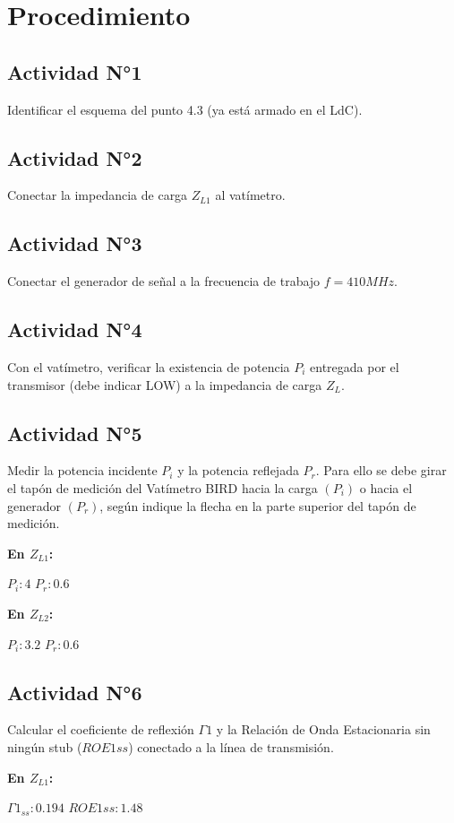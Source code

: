 \documentclass[12pt]{article}
\begin{document}
\section{Procedimiento}

\subsection{Actividad N°1}
Identificar el esquema del punto 4.3 (ya está armado en el LdC).

\subsection{Actividad N°2}
Conectar la impedancia de carga $Z_{L1}$ al vatímetro.

\subsection{Actividad N°3}
Conectar el generador de señal a la frecuencia de trabajo $f = 410 MHz$.
\subsection{Actividad N°4}
Con el vatímetro, verificar la existencia de potencia $P_i$ entregada por el transmisor (debe indicar LOW) a la impedancia de carga
$Z_L$.

\subsection{Actividad N°5}
Medir la potencia incidente $P_i$  y la potencia reflejada $P_r$. Para ello se debe girar el tapón de medición del Vatímetro BIRD hacia la
carga $(P_i)$ o hacia el generador $(P_r)$, según indique la flecha en la parte superior del tapón de medición.

\textbf{En $Z_{L1}$:}

$P_i:4 $
$P_r:0.6 $

\textbf{En $Z_{L2}$:}

$P_i:3.2 $
$P_r:0.6 $

\subsection{Actividad N°6}
 Calcular el coeficiente de reflexión $\Gamma 1$  y la Relación de Onda Estacionaria sin ningún stub ($ROE1ss$) conectado a la
 línea de transmisión.

\textbf{En $Z_{L1}$:}

$\Gamma 1_{ss}:0.194$
$ROE1ss: 1.48$
\end{document}
